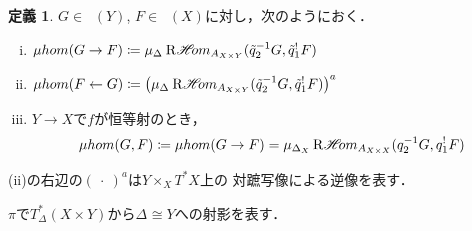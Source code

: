 \documentclass[leqno, 10pt, a4paper, dvipdfmx]{jsarticle}
\theoremstyle{definition}
\numberwithin{equation}{section}
\newcommand{\Dompb}{\mathop{\mathsf{D}^\mathrm{b}}\nolimits}
\newcommand{\HOM}{\mathop{\mathscr{H}\hspace{-2pt}om}\nolimits}%
\newcommand{\RHOM}{\mathop{\mathrm{R}\hspace{-1.5pt}\HOM}\nolimits}
\newcommand{\blk}{\mathord{\ \cdot\ }}
\newcommand{\tpb}[1][]{\mathbin{\mathop{\times}\nolimits_{#1}}}
\theoremstyle{mystyle}
\newtheorem{DFN}[AXM]{定義}
\newcommand{\cotb}[1][]{T^{\ast}{#1}}
\newcommand{\muhom}{\mu hom}
\newcommand{\diag}[1][]{\Delta_{#1}}
\begin{document}
\begin{DFN}\label{dfn4.4.1}
  \(G\in\Dompb(Y)\), \(F\in\Dompb(X)\)に対し，次のようにおく．
  \begin{enumerate}[(i)]
    \item \(\muhom(G\to F)\coloneqq\mu_{\diag[]}\RHOM_{A_{X\times Y}}(\tilde{q}_2^{-1}G,\tilde{q}_1^{!}F)\)
    \item \(\muhom(F\leftarrow G)\coloneqq\left(\mu_{\diag[]}\RHOM_{A_{X\times Y}}(\tilde{q}_2^{-1}G,\tilde{q}_1^{!}F)\right)^{a}\)
    \item \(Y\to X\)で\(f\)が恒等射のとき，\[
      \muhom(G,F)
      \coloneqq\muhom(G\to F)
      =\mu_{\diag[X]}\RHOM_{A_{X\times X}}({q}_2^{-1}G,{q}_1^{!}F)
    \]
  \end{enumerate}
\end{DFN}
(ii)の右辺の\((\blk)^{a}\)は\(Y\tpb[X]\cotb[X]\)上の
対蹠写像による逆像を表す．

\(\pi\)で\(T^{\ast}_{\diag[]}(X\times Y)\)から\(\diag[]\cong Y\)への射影を表す．
\end{document}
